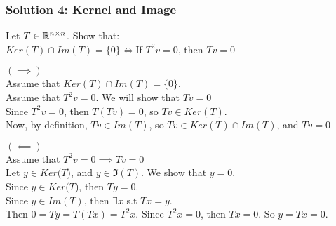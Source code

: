 \documentclass[table]{beamer}
\renewenvironment{enumerate}%
{\begin{list}{\arabic{enumi}.}%
      {\setlength{\leftmargin}{2.5em}%
       \setlength{\itemsep}{-\parsep}%
       \setlength{\topsep}{-\parskip}%
       \usecounter{enumi}}%
 }{\end{list}}
\begin{document}
\begin{frame}
\frametitle{Solution 4: Kernel and Image}
\begin{enumerate}
\item Let $T\in\mathbb{R}^{n\times n}$. Show that:\\
$Ker(T)\cap Im(T) = \{0\} \iff $If $T^2v=0$, then $ Tv=0$
\end{enumerate}

\begin{solution}
$(\implies)$ \\
Assume that $Ker(T)\cap Im(T) = \{0\}$.\\
Assume that $T^2v = 0$. We will show that $Tv=0$\\
Since $T^2v = 0$, then $T(Tv)=0$, so $Tv \in Ker(T)$.  \\
Now, by definition, $Tv\in Im(T)$, so $Tv\in Ker(T)\cap Im(T)$, and $Tv =0$

$(\impliedby)$ \\
Assume that $T^2v = 0 \implies Tv=0$\\
Let $y\in Ker(T$), and $y\in \Im(T)$. We show that $y=0$.\\
Since $y\in Ker(T$), then $Ty=0$.\\
Since $y\in Im(T)$, then $\exists x$ s.t $Tx=y$.\\
Then $0=Ty=T(Tx)= T^2x$. Since $T^2x=0$, then $Tx=0$. So $y=Tx=0$.
\end{solution}
\end{frame}
\end{document}
